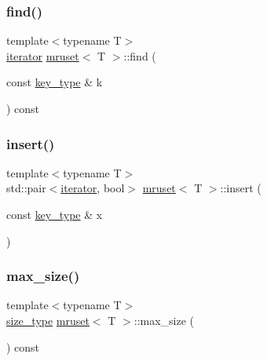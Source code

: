 \mbox{\label{classmruset_abe8cc5d73bc6efad0bdaf4fa51bcc362}} 
\subsubsection{\texorpdfstring{find()}{find()}}
{\footnotesize\ttfamily template$<$typename T$>$ \\
\mbox{\hyperlink{classmruset_a246172eda1afff45be47a013c14b1ad6}{iterator}} \mbox{\hyperlink{classmruset}{mruset}}$<$ T $>$\+::find (\begin{DoxyParamCaption}\item[{const \mbox{\hyperlink{classmruset_a282941ee7f0438b0c09274b10c78cda0}{key\+\_\+type}} \&}]{k }\end{DoxyParamCaption}) const\hspace{0.3cm}{\ttfamily [inline]}}

\mbox{\label{classmruset_af2e0dfe9d8b029bde78457797cdc42a9}} 
\subsubsection{\texorpdfstring{insert()}{insert()}}
{\footnotesize\ttfamily template$<$typename T$>$ \\
std\+::pair$<$\mbox{\hyperlink{classmruset_a246172eda1afff45be47a013c14b1ad6}{iterator}}, bool$>$ \mbox{\hyperlink{classmruset}{mruset}}$<$ T $>$\+::insert (\begin{DoxyParamCaption}\item[{const \mbox{\hyperlink{classmruset_a282941ee7f0438b0c09274b10c78cda0}{key\+\_\+type}} \&}]{x }\end{DoxyParamCaption})\hspace{0.3cm}{\ttfamily [inline]}}

\mbox{\label{classmruset_af33f9531e47639e4dc6a42c123797292}} 
\subsubsection{\texorpdfstring{max\+\_\+size()}{max\_size()}}
{\footnotesize\ttfamily template$<$typename T$>$ \\
\mbox{\hyperlink{classmruset_aaee46af18d8a5bdc503e9570e499a335}{size\+\_\+type}} \mbox{\hyperlink{classmruset}{mruset}}$<$ T $>$\+::max\+\_\+size (\begin{DoxyParamCaption}{ }\end{DoxyParamCaption}) const\hspace{0.3cm}{\ttfamily [inline]}}

